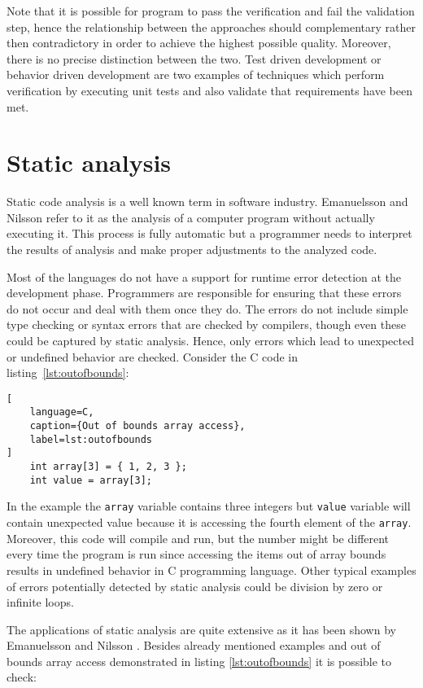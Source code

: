 \documentclass[12pt,final,oneside]{fithesis2}
\theoremstyle{definition}
\begin{document}
Note that it is possible for program to pass the verification and
fail the validation step, hence the relationship between the approaches
should complementary rather then contradictory in order to achieve the
highest possible quality. Moreover, there is no
precise distinction between the two. Test driven development or behavior
driven development are two examples of techniques which perform
verification by executing unit tests and also validate that requirements
have been met.


\section{Static analysis}

Static code analysis is a well known term in software industry. Emanuelsson and Nilsson
\cite{EmanuelssonNilsson08-1} refer to it as the analysis of a computer
program without actually executing it. This process is fully automatic
but a programmer needs to interpret the results of analysis and make
proper adjustments to the analyzed code.

Most of the languages do not have a support for runtime error detection at
the development phase. Programmers are responsible for ensuring that these
errors do not occur and deal with them once they do. The errors do not include
simple type checking or syntax errors that are checked by compilers, though
even these could be captured by static analysis. Hence, only
errors which lead to unexpected or undefined behavior are checked.
Consider the C code in listing~\ref{lst:outofbounds}:
\begin{lstlisting}[
    language=C,
    caption={Out of bounds array access},
    label=lst:outofbounds
]
    int array[3] = { 1, 2, 3 };
    int value = array[3];
\end{lstlisting}

In the example the \texttt{array} variable contains three integers but
\texttt{value} variable will contain unexpected value because it is
accessing the fourth element of the \texttt{array}. Moreover, this code will
compile and run, but the number might be different every
time the program is run since accessing the items out of array bounds results in
undefined behavior in C programming language. Other typical
examples of errors potentially detected by static analysis could be
division by zero or infinite loops.

The applications of static analysis are quite extensive as it has been
shown by Emanuelsson and Nilsson \cite{EmanuelssonNilsson08-1}. Besides
already mentioned examples and out of bounds array access demonstrated in
listing \ref{lst:outofbounds} it is possible to check:
\end{document}
